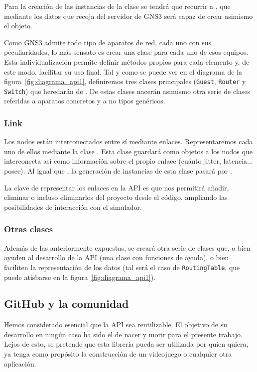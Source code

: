 Para la creación de las instancias de la clase se tendrá que recurrir a \GNSCS, que mediante los datos que recoja del servidor de GNS3 será capaz de crear asimismo el objeto.

Como GNS3 admite todo tipo de aparatos de red, cada uno con sus peculiaridades, lo más sensato es crear una clase para cada uno de esos equipos. Esta individualización permite definir métodos propios para cada elemento y, de este modo, facilitar su uso final. Tal y como se puede ver en el diagrama de la figura~\ref{fig:diagrama_api1}, definiremos tres clases principales (\texttt{Guest}, \texttt{Router} y \texttt{Switch}) que heredarán de \NODE. De estas clases nacerán asimismo otra serie de clases referidas a aparatos concretos y a no tipos genéricos.

\subsubsection{Link}
Los nodos están interconectados entre sí mediante enlaces. Representaremos cada uno de ellos mediante la clase \LINK. Esta clase guardará como objetos a los nodos que interconecta así como información sobre el propio enlace (cuánto jitter, latencia... posee). Al igual que \LINK, la generación de instancias de esta clase pasará por \GNSCS.

La clave de representar los enlaces en la API es que nos permitirá añadir, eliminar o incluso eliminarlos del proyecto desde el código, ampliando las posibilidades de interacción con el simulador.

\subsubsection{Otras clases}
Además de las anteriormente expuestas, se creará otra serie de clases que, o bien ayuden al desarrollo de la API (una clase con funciones de ayuda), o bien faciliten la representación de los datos (tal será el caso de \texttt{RoutingTable}, que puede atisbarse en la figura~\ref{fig:diagrama_api1}).

\subsection{GitHub y la comunidad}
Hemos considerado esencial que la API sea reutilizable. El objetivo de su desarrollo en ningún caso ha sido el de nacer y morir para el presente trabajo. Lejos de esto, se pretende que esta librería pueda ser utilizada por quien quiera, ya tenga como propósito la construcción de un videojuego o cualquier otra aplicación.

